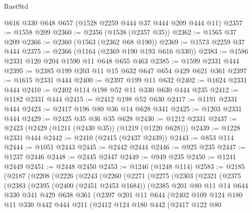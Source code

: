 \begin{lexlean}{RustStd}
\begin{coremodule}
    @616
    @330
    @648
    @657
    (@1528 @2259 @444 @37 @444 @209 @444 @11)
@2357 := @1558 @209
@2360 := @2356 (@1538 (@2357 @35))
@2362 := @1565 @37 @209
@2366 := @2360 (@1563 (@2362 @68 @190))
@2369 := @1573 @2259 @37 @444
@2375 := @2366 (@1164 (@2369 @190 @193 @616 @330))
@2383 := @1586 @2331 @120 @204 @1590 @11 @648 @655 @463
@2385 := @1599 @2331 @444
@2395 := @2385 @199 @203 @11 @15 @632 @647 @654 @429 @621 @361
@2397 := @1615 @2331 @444
@2400 := @2397 @199 @11 @632
@2402 := @1624 @2331 @444
@2410 := @2402 @114 @198 @52 @11 @330 @630 @444 @235
@2412 := @1182 @2331 @444
@2415 := @2412 @198 @52 @630
@2417 := @1191 @2331 @444
@2423 := @2417 @196 @80 @36 @14 @628 @341
@2425 := @1203 @2331 @444
@2429 := @2425 @35 @36 @35 @628
@2430 := @1212 @2331
@2437 := @2423 (@2429 (@1211 (@2430 @35)) (@1219 (@1220 @628)))
@2439 := @1228 @2331 @444
@2442 := @2410 (@2415 (@2437 @2439))
@2443 := @853 @114
@2444 := @1051 @2443
@2445 := @2442 @2444
@2446 := @925 @235
@2447 := @1237 @2446
@2448 := @2445 @2447
@2449 := @949 @235
@2450 := @1241 @2449
@2451 := @2448 @2450
@2453 := @1246 (@1248 @114)
@2583 := @2185
    (@2187
      (@2208
        (@2226
          (@2243
            (@2260
              (@2271
                (@2275
                  (@2303
                    (@2321
                      (@2375
                        (@2383
                          (@2395
                            (@2400 (@2451 @2453 @1684))
                            (@2385
                              @201
                              @80
                              @11
                              @14
                              @644
                              @330
                              @341
                              @429
                              @638
                              @361
                              (@2397
                                @201
                                @11
                                @644
                                (@2402
                                  @109
                                  @124
                                  @180
                                  @11
                                  @330
                                  @442
                                  @444
                                  @211
                                  (@2412
                                    @124
                                    @180
                                    @442
                                    (@2417
                                      @122
                                      @80

\end{coremodule}
\end{lexlean}
